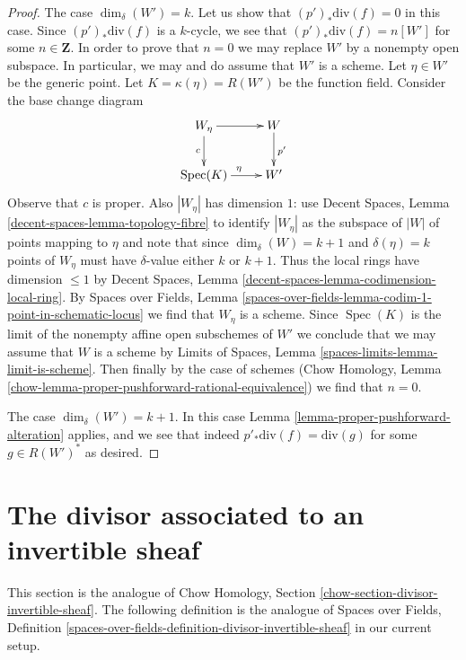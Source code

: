 \documentclass{stacks-project}
\theoremstyle{plain}
\theoremstyle{definition}
\theoremstyle{remark}
\numberwithin{equation}{subsection}
\def\Spec{\mathop{\mathrm{Spec}}}
\begin{document}
\begin{proof}
\medskip\noindent
The case $\dim_\delta(W') = k$. Let us show that $(p')_*\text{div}(f) = 0$
in this case. Since $(p')_*\text{div}(f)$ is a $k$-cycle, we see
that $(p')_*\text{div}(f) = n[W']$ for some $n \in \mathbf{Z}$.
In order to prove that $n = 0$ we may replace $W'$ by
a nonempty open subspace. In particular, we may and
do assume that $W'$ is a scheme. Let $\eta \in W'$ be the generic point.
Let $K = \kappa(\eta) = R(W')$ be the function field.
Consider the base change diagram
$$
\xymatrix{
W_\eta \ar[r] \ar[d]_c & W \ar[d]^{p'} \\
\Spec(K) \ar[r]^\eta & W'
}
$$
Observe that $c$ is proper. Also $|W_\eta|$ has dimension $1$:
use Decent Spaces, Lemma \ref{decent-spaces-lemma-topology-fibre}
to identify $|W_\eta|$ as the subspace of $|W|$ of points mapping to $\eta$
and note that since $\dim_\delta(W) = k + 1$ and $\delta(\eta) = k$
points of $W_\eta$ must have $\delta$-value either $k$ or $k + 1$.
Thus the local rings have dimension $\leq 1$ by
Decent Spaces, Lemma \ref{decent-spaces-lemma-codimension-local-ring}.
By Spaces over Fields, Lemma
\ref{spaces-over-fields-lemma-codim-1-point-in-schematic-locus}
we find that $W_\eta$ is a scheme.
Since $\Spec(K)$ is the limit of the nonempty affine open subschemes of $W'$
we conclude that we may assume that $W$ is a scheme by
Limits of Spaces, Lemma \ref{spaces-limits-lemma-limit-is-scheme}.
Then finally by the case of schemes
(Chow Homology, Lemma \ref{chow-lemma-proper-pushforward-rational-equivalence})
we find that $n = 0$.

\medskip\noindent
The case $\dim_\delta(W') = k + 1$. In this case
Lemma \ref{lemma-proper-pushforward-alteration} applies,
and we see that indeed $p'_*\text{div}(f) = \text{div}(g)$
for some $g \in R(W')^*$ as desired.
\end{proof}












\section{The divisor associated to an invertible sheaf}
\label{section-divisor-invertible-sheaf}

\noindent
This section is the analogue of
Chow Homology, Section \ref{chow-section-divisor-invertible-sheaf}.
The following definition is the analogue of
Spaces over Fields, Definition
\ref{spaces-over-fields-definition-divisor-invertible-sheaf}
in our current setup.
\end{document}
